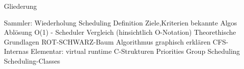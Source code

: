 Gliederung

Sammler:
Wiederholung Scheduling
	Definition
	Ziele,Kriterien
	bekannte Algos 
Ablösung O(1) - Scheduler
	Vergleich (hinsichtlich O-Notation)
Theorethische Grundlagen ROT-SCHWARZ-Baum
	Algorithmus graphisch erklären
CFS-Internas
	Elementar: virtual runtime
	C-Strukturen
	Priorities
	Group Scheduling
	Scheduling-Classes